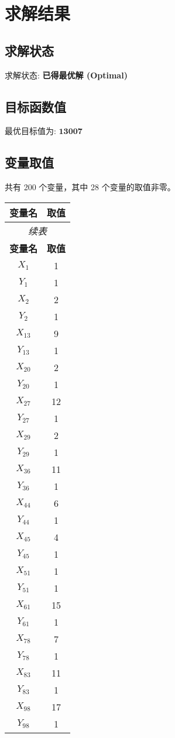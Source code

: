 \documentclass[a4paper,10pt]{article}
\begin{document}
\section{求解结果}

\subsection{求解状态}

求解状态: \textbf{已得最优解 (Optimal)}

\subsection{目标函数值}

最优目标值为: $\mathbf{13007}$

\subsection{变量取值}

共有 200 个变量，其中 28 个变量的取值非零。

\begin{center}
\begin{longtable}{cc}
\toprule
\textbf{变量名} & \textbf{取值} \\
\midrule
\endfirsthead
\multicolumn{2}{c}{\textit{续表}} \\
\toprule
\textbf{变量名} & \textbf{取值} \\
\midrule
\endhead
\bottomrule
\endfoot
\bottomrule
\endlastfoot
$X_{1}$ & 1 \\
$Y_{1}$ & 1 \\
$X_{2}$ & 2 \\
$Y_{2}$ & 1 \\
$X_{13}$ & 9 \\
$Y_{13}$ & 1 \\
$X_{20}$ & 2 \\
$Y_{20}$ & 1 \\
$X_{27}$ & 12 \\
$Y_{27}$ & 1 \\
$X_{29}$ & 2 \\
$Y_{29}$ & 1 \\
$X_{36}$ & 11 \\
$Y_{36}$ & 1 \\
$X_{44}$ & 6 \\
$Y_{44}$ & 1 \\
$X_{45}$ & 4 \\
$Y_{45}$ & 1 \\
$X_{51}$ & 1 \\
$Y_{51}$ & 1 \\
$X_{61}$ & 15 \\
$Y_{61}$ & 1 \\
$X_{78}$ & 7 \\
$Y_{78}$ & 1 \\
$X_{83}$ & 11 \\
$Y_{83}$ & 1 \\
$X_{98}$ & 17 \\
$Y_{98}$ & 1 \\
\end{longtable}
\end{center}
\end{document}
